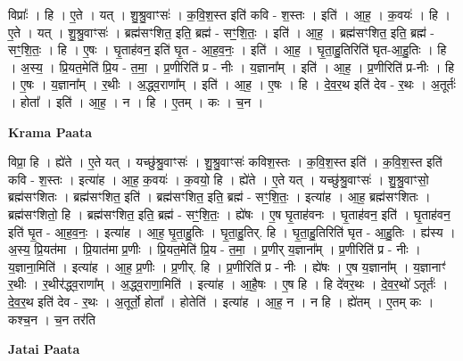 \documentclass[17pt]{extarticle}
\begin{document}
विप्राः᳚ । हि । ए॒ते । यत् । शु॒श्रु॒वाꣳसः॑ । क॒वि॒श॒स्त इति॑ कवि - श॒स्तः । इति॑ । आ॒ह॒ । क॒वयः॑ । हि । ए॒ते । यत् । शु॒श्रु॒वाꣳसः॑ । ब्रह्म॑सꣳशित॒ इति॒ ब्रह्म॑ - सꣳ॒॒शि॒तः॒ । इति॑ । आ॒ह॒ । ब्रह्म॑सꣳशित॒ इति॒ ब्रह्म॑ - सꣳ॒॒शि॒तः॒ । हि । ए॒षः । घृ॒ताह॑वन॒ इति॑ घृ॒त - आ॒ह॒व॒नः॒ । इति॑ । आ॒ह॒ । घृ॒ता॒हु॒तिरिति॑ घृत-आ॒हु॒तिः । हि । अ॒स्य॒ । प्रि॒यत॒मेति॑ प्रि॒य - त॒मा॒ । प्र॒णीरिति॑ प्र - नीः । य॒ज्ञाना᳚म् । इति॑ । आ॒ह॒ । प्र॒णीरिति॑ प्र-नीः । हि । ए॒षः । य॒ज्ञाना᳚म् । र॒थीः । अ॒द्ध्व॒राणा᳚म् । इति॑ । आ॒ह॒ । ए॒षः । हि । दे॒व॒र॒थ इति॑ देव - र॒थः । अ॒तूर्तः॑ । होता᳚ । इति॑ । आ॒ह॒ । न । हि । ए॒तम् । कः । च॒न ।  \newline


\textbf{Krama Paata} \newline

विप्रा॒ हि । ह्ये॑ते । ए॒ते यत् । यच्छु॑श्रु॒वाꣳसः॑ । शु॒श्रु॒वाꣳसः॑ कविश॒स्तः । क॒वि॒श॒स्त इति॑ । क॒वि॒श॒स्त इति॑ कवि - श॒स्तः । इत्या॑ह । आ॒ह॒ क॒वयः॑ । क॒वयो॒ हि । ह्ये॑ते । ए॒ते यत् । यच्छु॑श्रु॒वाꣳसः॑ । शु॒श्रु॒वाꣳसो॒ ब्रह्म॑सꣳशितः । ब्रह्म॑सꣳशित॒ इति॑ । ब्रह्म॑सꣳशित॒ इति॒ ब्रह्म॑ - सꣳ॒॒शि॒तः॒ । इत्या॑ह । आ॒ह॒ ब्रह्म॑सꣳशितः । ब्रह्म॑सꣳशितो॒ हि । ब्रह्म॑सꣳशित॒ इति॒ ब्रह्म॑ - सꣳ॒॒शि॒तः॒ । ह्ये॑षः । ए॒ष घृ॒ताह॑वनः । घृ॒ताह॑वन॒ इति॑ । घृ॒ताह॑वन॒ इति॑ घृ॒त - आ॒ह॒व॒नः॒ । इत्या॑ह । आ॒ह॒ घृ॒ता॒हु॒तिः । घृ॒ता॒हु॒तिर्. हि । घृ॒ता॒हु॒तिरिति॑ घृत - आ॒हु॒तिः । ह्य॑स्य । अ॒स्य॒ प्रि॒यत॑मा । प्रि॒यात॑मा प्र॒णीः । प्रि॒यत॒मेति॑ प्रि॒य - त॒मा॒ । प्र॒णीर् य॒ज्ञाना᳚म् । प्र॒णीरिति॑ प्र - नीः । य॒ज्ञाना॒मिति॑ । इत्या॑ह । आ॒ह॒ प्र॒णीः । प्र॒णीर्. हि । प्र॒णीरिति॑ प्र - नीः । ह्ये॑षः । ए॒ष य॒ज्ञाना᳚म् । य॒ज्ञानाꣳ॑ र॒थीः । र॒थीर॑द्ध्व॒राणा᳚म् । अ॒द्ध्व॒राणा॒मिति॑ । इत्या॑ह । आ॒है॒षः । ए॒ष हि । हि दे॑वर॒थः । दे॒व॒र॒थो॑ ऽतूर्तः॑ । दे॒व॒र॒थ इति॑ देव - र॒थः । अ॒तूर्तो॒ होता᳚ । होतेति॑ । इत्या॑ह । आ॒ह॒ न । न हि । ह्ये॑तम् । ए॒तम् कः । कश्च॒न । च॒न तर॑ति \newline

\textbf{Jatai Paata} \newline
\end{document}
